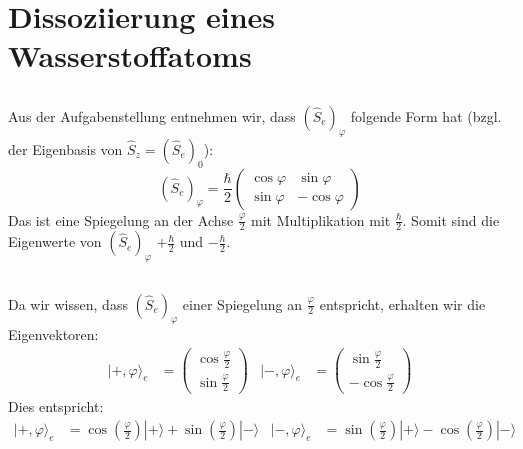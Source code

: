 \documentclass[11pt, ngerman, fleqn, DIV=15, headinclude]{scrartcl}
\begin{document}
\section{Dissoziierung eines Wasserstoffatoms}
\subsection{}
	Aus der Aufgabenstellung entnehmen wir, dass $(\hat{S}_e)_\varphi$ folgende Form hat (bzgl. der Eigenbasis von $\hat{S}_z=(\hat{S}_e)_0$):
	\begin{equation*}
		(\hat{S}_e)_\varphi=\frac{\hbar}{2}\begin{pmatrix} \cos\varphi & \sin\varphi \\ \sin\varphi & -\cos\varphi\end{pmatrix}
	\end{equation*}
	Das ist eine Spiegelung an der Achse $\frac{\varphi}{2}$ mit Multiplikation mit $\frac{\hbar}{2}$. Somit sind die Eigenwerte von $(\hat{S}_e)_\varphi$ $+\frac{\hbar}{2}$ und $-\frac{\hbar}{2}$.

\subsection{}
	Da wir wissen, dass $(\hat{S}_e)_\varphi$ einer Spiegelung an $\frac{\varphi}{2}$ entspricht, erhalten wir die Eigenvektoren:
	\begin{align*}
		|+,\varphi\rangle_e&=\begin{pmatrix} \cos\frac{\varphi}{2} \\ \sin\frac{\varphi}{2} \end{pmatrix} & |-,\varphi\rangle_e&=\begin{pmatrix} \sin\frac{\varphi}{2} \\ -\cos\frac{\varphi}{2} \end{pmatrix}
	\end{align*}
	Dies entspricht:
	\begin{align*}
		|+,\varphi\rangle_e&= \cos\left(\frac{\varphi}{2}\right) |+\rangle +\sin\left(\frac{\varphi}{2}\right) |-\rangle & |-,\varphi\rangle_e&= \sin\left(\frac{\varphi}{2}\right) |+\rangle -\cos\left(\frac{\varphi}{2}\right) |-\rangle
	\end{align*}
\end{document}
